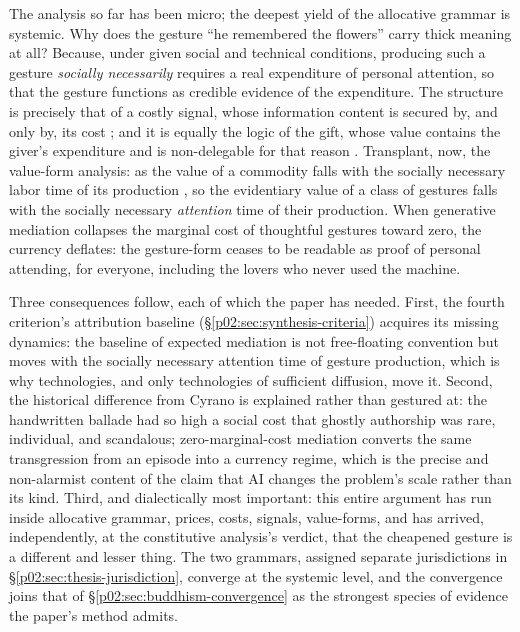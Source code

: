 The analysis so far has been micro; the deepest yield of the allocative grammar is systemic. Why does the gesture ``he remembered the flowers'' carry thick meaning at all? Because, under given social and technical conditions, producing such a gesture \emph{socially necessarily} requires a real expenditure of personal attention, so that the gesture functions as credible evidence of the expenditure. The structure is precisely that of a costly signal, whose information content is secured by, and only by, its cost \parencite{spence1973job}; and it is equally the logic of the gift, whose value contains the giver's expenditure and is non-delegable for that reason \parencite{mauss1925gift}. Transplant, now, the value-form analysis: as the value of a commodity falls with the socially necessary labor time of its production \parencite{marx1867capital}, so the evidentiary value of a class of gestures falls with the socially necessary \emph{attention} time of their production. When generative mediation collapses the marginal cost of thoughtful gestures toward zero, the currency deflates: the gesture-form ceases to be readable as proof of personal attending, for everyone, including the lovers who never used the machine.

Three consequences follow, each of which the paper has needed. First, the fourth criterion's attribution baseline (\S\ref{p02:sec:synthesis-criteria}) acquires its missing dynamics: the baseline of expected mediation is not free-floating convention but moves with the socially necessary attention time of gesture production, which is why technologies, and only technologies of sufficient diffusion, move it. Second, the historical difference from Cyrano is explained rather than gestured at: the handwritten ballade had so high a social cost that ghostly authorship was rare, individual, and scandalous; zero-marginal-cost mediation converts the same transgression from an episode into a currency regime, which is the precise and non-alarmist content of the claim that AI changes the problem's scale rather than its kind. Third, and dialectically most important: this entire argument has run inside allocative grammar, prices, costs, signals, value-forms, and has arrived, independently, at the constitutive analysis's verdict, that the cheapened gesture is a different and lesser thing. The two grammars, assigned separate jurisdictions in \S\ref{p02:sec:thesis-jurisdiction}, converge at the systemic level, and the convergence joins that of \S\ref{p02:sec:buddhism-convergence} as the strongest species of evidence the paper's method admits.

